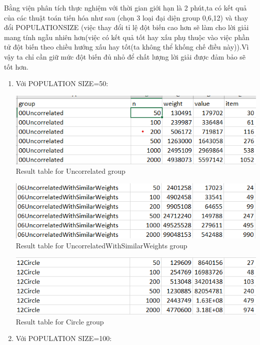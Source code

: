 \documentclass{article}
\begin{document}
Bằng viện phân tích thực nghiệm với thời gian giới hạn là 2 phút,ta có kết quả của các thuật toán tiến hóa như sau (chọn 3 loại đại diện group 0,6,12) và thay đổi POPULATIONSIZE (việc thay đổi tỉ lệ đột biến cao hơn sẽ làm cho lời giải mang tính ngẫu nhiên hơn(việc có kết quả tốt hay xấu phụ thuộc vào việc phần tử đột biến theo chiều hướng xấu hay tốt(ta không thể khống chế điều này)).Vì vậy ta chỉ cần giữ mức đột biến đủ nhỏ để chất lượng lời giải được đảm bảo sẽ tốt hơn.
\begin{enumerate}
    \item Với POPULATION SIZE=50:
\begin{center}
    \centering
    \includegraphics[width=15cm]{image/report1.png}
    \\
    \caption{ Result table for Uncorrelated group}
\end{center}
\begin{center}
    \centering
    \includegraphics[width=15cm]{image/report2.png}
    \\
    \caption{ Result table for UncorrelatedWithSimilarWeights group}
\end{center}
\begin{center}
    \centering
    \includegraphics[width=15cm]{image/report3.png}
    \\
    \caption{ Result table for Circle group}
\end{center}
    \item Với POPULATION SIZE=100:

\end{enumerate}
\end{document}

